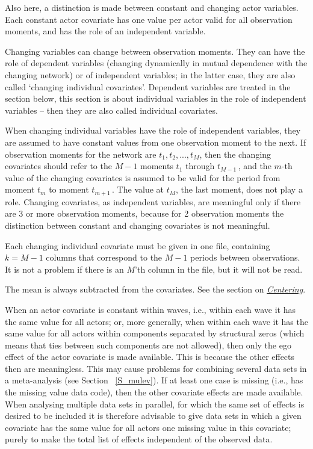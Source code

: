 \documentclass[a4paper,fleqn]{article}
\newcommand{\+}{\, + \,}
\begin{document}
{Also here, a distinction is made between constant and changing actor
variables. Each constant actor covariate has one value per actor
valid for all observation moments, and has the role of an
independent variable.

Changing variables can change between observation moments. They
can have the role of dependent variables (changing dynamically in
mutual dependence with the changing network) or of independent
variables; in the latter case, they are also called `changing
individual covariates'. Dependent variables are treated in the
section below, this section is about individual variables
in the role of independent variables -- then they are also
called individual covariates.

When changing individual variables have the role of
independent variables, they are assumed to have constant values from one
observation moment to the next. If observation moments for the
network are $t_1, t_2, ..., t_M$, then the changing covariates
should refer to the $M-1$ moments $t_1$ through $t_{M-1}\,$, and
the $m$-th value of the changing covariates is assumed to be valid
for the period from moment $t_m$ to moment $t_{m+1}\,$.
The value at $t_M$, the last moment, does not play a role.
Changing covariates, as independent variables, are meaningful
only if there are 3 or more observation moments,
because for 2 observation moments the distinction between
constant and changing covariates is not meaningful.

Each changing individual covariate must be given in one file,
containing $k = M-1$ columns that correspond to the $M-1$ periods
between observations.
It is not a problem if there is an $M$'th column in the file,
but it will not be read.

The mean is always subtracted from the covariates.
See the section on \hyperlink{T_S_centering}{\emph{Centering}}.

When an actor covariate is constant within waves, i.e.,
within each wave it has the same value for all actors;
or, more generally, when within each wave it has the same value for
all actors
within components separated by structural zeros (which means that
ties between such components are not allowed), then only the ego effect
of the actor covariate is made available.
This is because the other effects then are meaningless.
This may cause problems for combining several data sets
in a meta-analysis (see Section ~\ref{S_mulev}).
If at least one case is missing (i.e., has the missing value data code),
then the other covariate effects are made available.
When analysing multiple data sets in parallel,
for which the same set of effects is desired to be included %
it is therefore advisable to give data sets in which
a given covariate has the same value for all actors
one missing value in this covariate;
purely to make
the total list of effects %
independent of the observed data.


}
\end{document}
